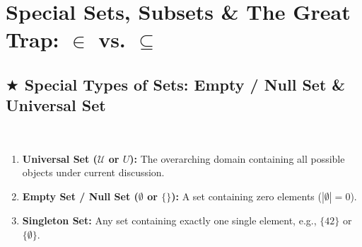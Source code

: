 \documentclass[11pt,a4paper]{article}
\begin{document}
\section{Special Sets, Subsets \& The Great Trap: \texorpdfstring{$\in$}{in} vs. \texorpdfstring{$\subseteq$}{subset}}

\subsection{\texorpdfstring{$\bigstar$ }{*}Special Types of Sets: Empty / Null Set \& Universal Set}
\\[3pt]
\begin{enumerate}
    \item \textbf{Universal Set ($\mathcal{U}$ or $U$):} The overarching domain containing all possible objects under current discussion.
    \item \textbf{Empty Set / Null Set ($\emptyset$ or $\{\}$):} A set containing zero elements ($|\emptyset| = 0$).
    \item \textbf{Singleton Set:} Any set containing exactly one single element, e.g., $\{42\}$ or $\{\emptyset\}$.
\end{enumerate}
\end{document}
